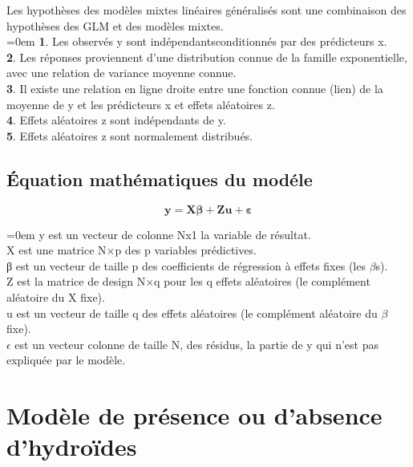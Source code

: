 \documentclass{article}
\theoremstyle{definition}
\begin{document}
Les hypothèses des modèles mixtes linéaires généralisés sont une combinaison des hypothèses des GLM et des modèles mixtes.
\\

\parindent=0em \textbf{1}. Les observés y sont indépendantsconditionnés par des prédicteurs x.\\
\textbf{2}. Les réponses proviennent d'une distribution connue de la famille exponentielle, avec une relation de variance moyenne connue.\\
\textbf{3}. Il existe une relation en ligne droite entre une fonction connue (lien) de la moyenne de y et les prédicteurs x et effets aléatoires z.\\
\textbf{4}. Effets aléatoires z sont indépendants de y.\\
\textbf{5}. Effets aléatoires z sont normalement distribués.\\



\subsection{Équation mathématiques du modéle}

\vspace{2cm}

$$\mathbf{y} = \boldsymbol{X\beta} + \boldsymbol{Zu} + \boldsymbol{\varepsilon}$$

\vspace{2cm}


\parindent=0em y est un vecteur de colonne Nx1 la variable de résultat.\\
X est une matrice N×p des p variables prédictives.\\
β est un vecteur de taille p des coefficients de régression à effets fixes (les $\beta$s).\\
Z est la matrice de design N×q pour les q effets aléatoires (le complément aléatoire du X fixe).\\
u est un vecteur de taille q des effets aléatoires (le complément aléatoire du $\beta$ fixe).\\
$\epsilon$ est un vecteur colonne de taille N, des résidus, la partie de y qui n'est pas expliquée par le modèle.
\\

\newpage 


\section{Modèle de présence ou d'absence d'hydroïdes}
\end{document}
